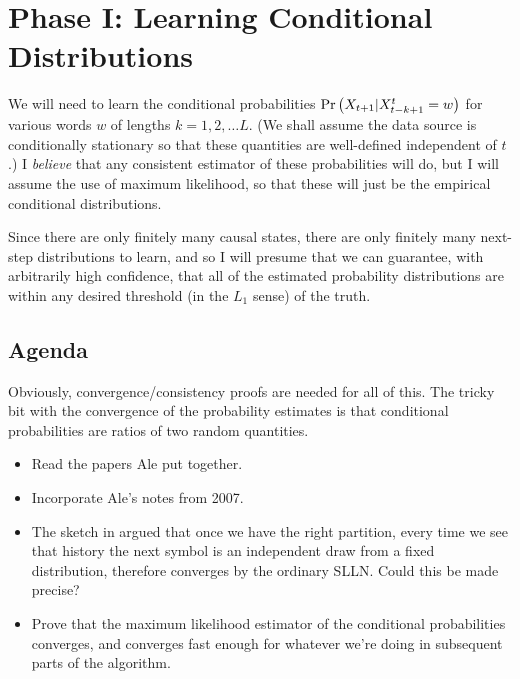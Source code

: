 \documentclass[../new-procedure.tex]{subfiles}
\begin{document}
\section{Phase I: Learning Conditional Distributions}

We will need to learn the conditional probabilities $\mathrm{Pr}\left( X_{t+1}|X^t_{t-k+1}
  = w \right) $ for various words $w$ of lengths $k=1, 2, \ldots L$.  (We shall assume
the data source is conditionally stationary so that these quantities are
well-defined independent of $t$.)  I {\em believe} that any consistent
estimator of these probabilities will do, but I will assume the use of maximum
likelihood, so that these will just be the empirical conditional distributions.

Since there are only finitely many causal states, there are only finitely many
next-step distributions to learn, and so I will presume that we can guarantee,
with arbitrarily high confidence, that all of the estimated probability
distributions are within any desired threshold (in the $L_1$ sense) of the
truth.

\subsection{Agenda}

Obviously, convergence/consistency proofs are needed for all of this.  The
tricky bit with the convergence of the probability estimates is that
conditional probabilities are ratios of two random quantities.

\begin{itemize}
\item Read the papers Ale put together.
\item Incorporate Ale's notes from 2007.
\item The sketch in \cite{CSSR-for-UAI} argued that once we have the right
  partition, every time we see that history the next symbol is an independent
  draw from a fixed distribution, therefore converges by the ordinary SLLN.
  Could this be made precise?
\item Prove that the maximum likelihood estimator of the conditional
  probabilities converges, and converges fast enough for whatever we're doing
  in subsequent parts of the algorithm.
\end{itemize}
\end{document}
